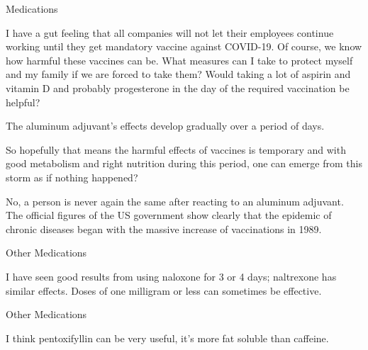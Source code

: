 \documentclass[11pt,oneside,openany,extrafontsizes]{memoir}
\begin{document}
\begin{emailexchange}{Medications}

    \begin{question}
        I have a gut feeling that all companies will not let their employees continue working until they get mandatory vaccine against COVID-19. Of course, we know how harmful these vaccines can be. What measures can I take to protect myself and my family if we are forced to take them? Would taking a lot of aspirin and vitamin D and probably progesterone in the day of the required vaccination be helpful?
    \end{question}

    \begin{answer}
        The aluminum adjuvant's effects develop gradually over a period of days.
    \end{answer}

    \begin{question}
        So hopefully that means the harmful effects of vaccines is temporary and with good metabolism and right nutrition during this period, one can emerge from this storm as if nothing happened?
    \end{question}

    \begin{answer}
        No, a person is never again the same after reacting to an aluminum adjuvant. The official figures of the US government show clearly that the epidemic of chronic diseases began with the massive increase of vaccinations in 1989.
    \end{answer}
\end{emailexchange}

\begin{standalonequote}{Other Medications}

    \begin{answer}
      I have seen good results from using naloxone for 3 or 4 days; naltrexone has similar effects. Doses of one milligram or less can sometimes be effective.
    \end{answer}
\end{standalonequote}

\begin{standalonequote}{Other Medications}

    \begin{answer}
      I think pentoxifyllin can be very useful, it's more fat soluble than caffeine.
    \end{answer}
\end{standalonequote}
\end{document}
